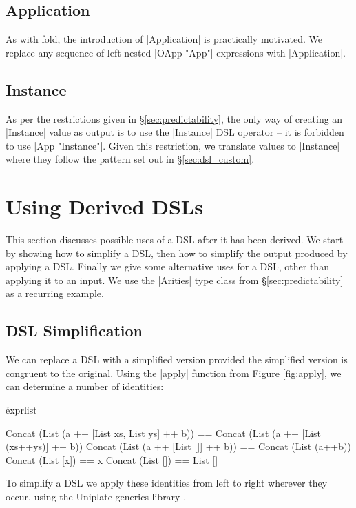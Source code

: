 \documentclass[preprint,draft]{sigplanconf}
\begin{document}
\subsection{Application}

As with fold, the introduction of |Application| is practically motivated. We replace any sequence of left-nested |OApp "App"| expressions with |Application|.

\subsection{Instance}

As per the restrictions given in \S\ref{sec:predictability}, the only way of creating an |Instance| value as output is to use the |Instance| DSL operator -- it is forbidden to use |App "Instance"|. Given this restriction, we translate values to |Instance| where they follow the pattern set out in \S\ref{sec:dsl_custom}.

\section{Using Derived DSLs}
\label{sec:using}

This section discusses possible uses of a DSL after it has been derived. We start by showing how to simplify a DSL, then how to simplify the output produced by applying a DSL. Finally we give some alternative uses for a DSL, other than applying it to an input. We use the |Arities| type class from \S\ref{sec:predictability} as a recurring example.

\subsection{DSL Simplification}
\label{sec:dsl_simplify}

We can replace a DSL with a simplified version provided the simplified version is congruent to the original. Using the |apply| function from Figure \ref{fig:apply}, we can determine a number of identities:

\h{exprlist}\begin{code}
Concat (List (a ++ [List xs, List ys] ++ b)) ==
    Concat (List (a ++ [List (xs++ys)] ++ b))
Concat (List (a ++ [List []] ++ b)) == Concat (List (a++b))
Concat (List [x]) == x
Concat (List []) == List []
\end{code}

To simplify a DSL we apply these identities from left to right wherever they occur, using the Uniplate generics library \cite{me:uniplate}.
\end{document}

